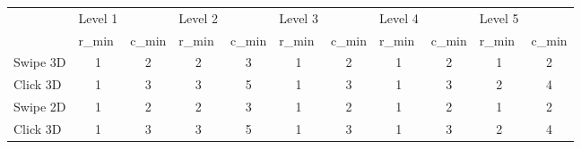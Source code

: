 
    \begin{tabular}{|p{5.93em}|cc|cc|cc|cc|cc|}
\cline{2-11}    \multicolumn{1}{r|}{} & \multicolumn{1}{l}{\cellcolor[rgb]{ .816,  .808,  .808}Level 1} & \cellcolor[rgb]{ .816,  .808,  .808} & \multicolumn{1}{l}{\cellcolor[rgb]{ .816,  .808,  .808}Level 2} & \cellcolor[rgb]{ .816,  .808,  .808} & \multicolumn{1}{l}{\cellcolor[rgb]{ .816,  .808,  .808}Level 3} & \cellcolor[rgb]{ .816,  .808,  .808} & \multicolumn{1}{l}{\cellcolor[rgb]{ .816,  .808,  .808}Level 4} & \cellcolor[rgb]{ .816,  .808,  .808} & \multicolumn{1}{l}{\cellcolor[rgb]{ .816,  .808,  .808}Level 5} & \cellcolor[rgb]{ .816,  .808,  .808} \bigstrut[t]\\
    \multicolumn{1}{r|}{} & \multicolumn{1}{l}{\cellcolor[rgb]{ .749,  .749,  .749}r\_min} & \multicolumn{1}{l|}{\cellcolor[rgb]{ .749,  .749,  .749}c\_min} & \multicolumn{1}{l}{\cellcolor[rgb]{ .749,  .749,  .749}r\_min} & \multicolumn{1}{l|}{\cellcolor[rgb]{ .749,  .749,  .749}c\_min} & \multicolumn{1}{l}{\cellcolor[rgb]{ .749,  .749,  .749}r\_min} & \multicolumn{1}{l|}{\cellcolor[rgb]{ .749,  .749,  .749}c\_min} & \multicolumn{1}{l}{\cellcolor[rgb]{ .749,  .749,  .749}r\_min} & \multicolumn{1}{l|}{\cellcolor[rgb]{ .749,  .749,  .749}c\_min} & \multicolumn{1}{l}{\cellcolor[rgb]{ .749,  .749,  .749}r\_min} & \multicolumn{1}{l|}{\cellcolor[rgb]{ .749,  .749,  .749}c\_min} \bigstrut[b]\\
    \hline
    \rowcolor[rgb]{ .749,  .749,  .749} Swipe 3D & \cellcolor[rgb]{ 1,  1,  1}1 & \cellcolor[rgb]{ 1,  1,  1}2 & \cellcolor[rgb]{ 1,  1,  1}2 & \cellcolor[rgb]{ 1,  1,  1}3 & \cellcolor[rgb]{ 1,  1,  1}1 & \cellcolor[rgb]{ 1,  1,  1}2 & \cellcolor[rgb]{ 1,  1,  1}1 & \cellcolor[rgb]{ 1,  1,  1}2 & \cellcolor[rgb]{ 1,  1,  1}1 & \cellcolor[rgb]{ 1,  1,  1}2 \bigstrut\\
\cline{2-11}    \rowcolor[rgb]{ .651,  .651,  .651} Click 3D & \cellcolor[rgb]{ .906,  .902,  .902}1 & \cellcolor[rgb]{ .906,  .902,  .902}3 & \cellcolor[rgb]{ .906,  .902,  .902}3 & \cellcolor[rgb]{ .906,  .902,  .902}5 & \cellcolor[rgb]{ .906,  .902,  .902}1 & \cellcolor[rgb]{ .906,  .902,  .902}3 & \cellcolor[rgb]{ .906,  .902,  .902}1 & \cellcolor[rgb]{ .906,  .902,  .902}3 & \cellcolor[rgb]{ .906,  .902,  .902}2 & \cellcolor[rgb]{ .906,  .902,  .902}4 \bigstrut\\
\cline{2-11}    \rowcolor[rgb]{ .749,  .749,  .749} Swipe 2D & \cellcolor[rgb]{ 1,  1,  1}1 & \cellcolor[rgb]{ 1,  1,  1}2 & \cellcolor[rgb]{ 1,  1,  1}2 & \cellcolor[rgb]{ 1,  1,  1}3 & \cellcolor[rgb]{ 1,  1,  1}1 & \cellcolor[rgb]{ 1,  1,  1}2 & \cellcolor[rgb]{ 1,  1,  1}1 & \cellcolor[rgb]{ 1,  1,  1}2 & \cellcolor[rgb]{ 1,  1,  1}1 & \cellcolor[rgb]{ 1,  1,  1}2 \bigstrut\\
\cline{2-11}    \rowcolor[rgb]{ .651,  .651,  .651} Click 3D & \cellcolor[rgb]{ .906,  .902,  .902}1 & \cellcolor[rgb]{ .906,  .902,  .902}3 & \cellcolor[rgb]{ .906,  .902,  .902}3 & \cellcolor[rgb]{ .906,  .902,  .902}5 & \cellcolor[rgb]{ .906,  .902,  .902}1 & \cellcolor[rgb]{ .906,  .902,  .902}3 & \cellcolor[rgb]{ .906,  .902,  .902}1 & \cellcolor[rgb]{ .906,  .902,  .902}3 & \cellcolor[rgb]{ .906,  .902,  .902}2 & \cellcolor[rgb]{ .906,  .902,  .902}4 \bigstrut\\
    \hline
    \end{tabular}%
